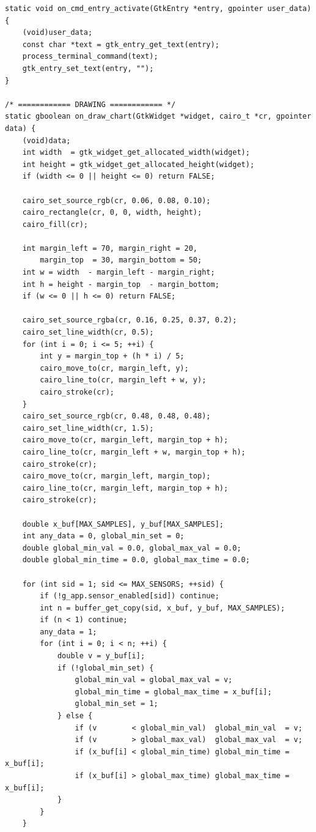 \begin{verbatim}
static void on_cmd_entry_activate(GtkEntry *entry, gpointer user_data) {
    (void)user_data;
    const char *text = gtk_entry_get_text(entry);
    process_terminal_command(text);
    gtk_entry_set_text(entry, "");
}

/* ============ DRAWING ============ */
static gboolean on_draw_chart(GtkWidget *widget, cairo_t *cr, gpointer data) {
    (void)data;
    int width  = gtk_widget_get_allocated_width(widget);
    int height = gtk_widget_get_allocated_height(widget);
    if (width <= 0 || height <= 0) return FALSE;

    cairo_set_source_rgb(cr, 0.06, 0.08, 0.10);
    cairo_rectangle(cr, 0, 0, width, height);
    cairo_fill(cr);

    int margin_left = 70, margin_right = 20,
        margin_top  = 30, margin_bottom = 50;
    int w = width  - margin_left - margin_right;
    int h = height - margin_top  - margin_bottom;
    if (w <= 0 || h <= 0) return FALSE;

    cairo_set_source_rgba(cr, 0.16, 0.25, 0.37, 0.2);
    cairo_set_line_width(cr, 0.5);
    for (int i = 0; i <= 5; ++i) {
        int y = margin_top + (h * i) / 5;
        cairo_move_to(cr, margin_left, y);
        cairo_line_to(cr, margin_left + w, y);
        cairo_stroke(cr);
    }
    cairo_set_source_rgb(cr, 0.48, 0.48, 0.48);
    cairo_set_line_width(cr, 1.5);
    cairo_move_to(cr, margin_left, margin_top + h);
    cairo_line_to(cr, margin_left + w, margin_top + h);
    cairo_stroke(cr);
    cairo_move_to(cr, margin_left, margin_top);
    cairo_line_to(cr, margin_left, margin_top + h);
    cairo_stroke(cr);

    double x_buf[MAX_SAMPLES], y_buf[MAX_SAMPLES];
    int any_data = 0, global_min_set = 0;
    double global_min_val = 0.0, global_max_val = 0.0;
    double global_min_time = 0.0, global_max_time = 0.0;

    for (int sid = 1; sid <= MAX_SENSORS; ++sid) {
        if (!g_app.sensor_enabled[sid]) continue;
        int n = buffer_get_copy(sid, x_buf, y_buf, MAX_SAMPLES);
        if (n < 1) continue;
        any_data = 1;
        for (int i = 0; i < n; ++i) {
            double v = y_buf[i];
            if (!global_min_set) {
                global_min_val = global_max_val = v;
                global_min_time = global_max_time = x_buf[i];
                global_min_set = 1;
            } else {
                if (v        < global_min_val)  global_min_val  = v;
                if (v        > global_max_val)  global_max_val  = v;
                if (x_buf[i] < global_min_time) global_min_time = x_buf[i];
                if (x_buf[i] > global_max_time) global_max_time = x_buf[i];
            }
        }
    }


\end{verbatim}
